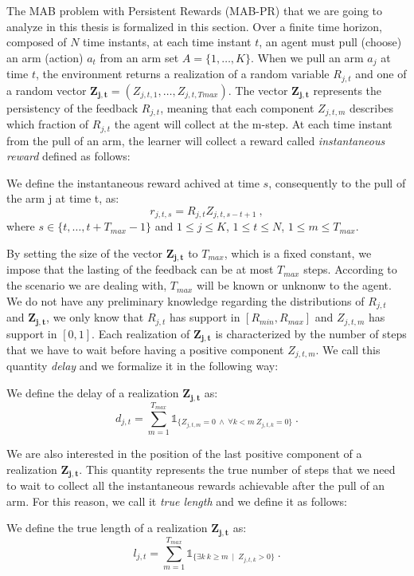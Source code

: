 The MAB problem with Persistent Rewards (MAB-PR) that we are going to analyze in this thesis is formalized in this section. Over a finite time horizon, composed of $N$ time instants, at each time instant $t$, an agent must pull (choose) an arm (action) $a_t$ from an arm set $A =\{1, \dots, K\} $. When we pull an arm $a_j$ at time $t$, the environment returns a realization of a random variable $R_{j,t}$ and one of a random vector $\boldsymbol{Z_{j,t}}= (Z_{j,t,1},\dots, Z_{j,t,Tmax})$. The vector $\boldsymbol{Z_{j,t}}$ represents the persistency of the feedback $R_{j,t}$, meaning that each component $Z_{j,t,m}$ describes which fraction of $R_{j,t}$ the agent will collect at the m-step. At each time instant from the pull of an arm, the learner will collect a reward called \emph{instantaneous reward} defined as follows:
\begin{definition}
	We define the instantaneous reward achived at time $s$, consequently to the pull of the arm j at time t, as:	
		$$r_{j,t,s} = R_{j,t} Z_{j,t,s-t+1} \ ,$$
where $s \in \{t,\dots,t+T_{max}-1\}$ and $1\leq j \leq K$, $1\leq t \leq N$, $1\leq m \leq T_{max}$.
\end{definition}
By setting the size of the vector $\boldsymbol{Z_{j,t}}$ to $T_{max}$, which is a fixed constant, we impose that the lasting of the feedback can be at most $T_{max}$ steps. According to the scenario we are dealing with, $T_{max}$ will be known or unknonw to the agent. We do not have any preliminary knowledge regarding the distributions of $R_{j,t}$ and $\boldsymbol{Z_{j,t}}$, we only know that $R_{j,t}$ has support in $[R_{min},R_{max}]$ and $Z_{j,t,m}$ has support in $[0,1]$. Each realization of $\boldsymbol{Z_{j,t}}$ is characterized by the number of steps that we have to wait before having a positive component $Z_{j,t,m}$. We call this quantity \emph{delay} and we formalize it in the following way:
\begin{definition}[Delay]
	We define the delay of a realization $\boldsymbol{Z_{j,t}}$ as:$$d_{j,t} = \sum_{m=1}^{T_{max}}\mathds{1}_{\{Z_{j,t,m}=0\ \wedge\ \forall k<m\ Z_{j,t,k} = 0\}}\ .$$

\end{definition}
We are also interested in the position of the last positive component of a realization $\boldsymbol{Z_{j,t}}$. This quantity represents the true number of steps that we need to wait to collect all the instantaneous rewards achievable after the pull of an arm. For this reason, we call it \emph{true length} and we define it as follows:
\begin{definition}
	We define the true length of a realization $\boldsymbol{Z_{j,t}}$ as:
		$$l_{j,t} = \sum_{m=1}^{T_{max}}\mathds{1}_{\{\exists k \ k\geq m \ \mid \ Z_{j,t,k} > 0\}} \ .$$
\end{definition}




